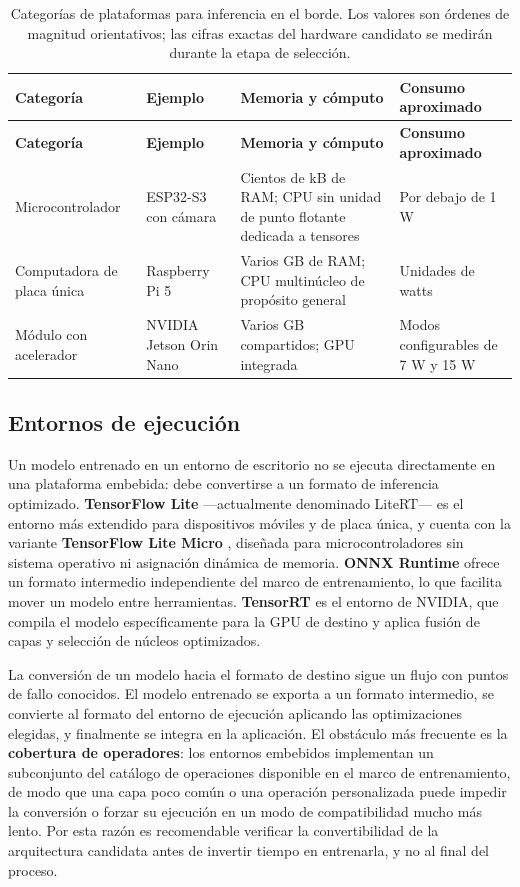 \begin{longtable}{L{2.9cm}L{3.3cm}L{3.3cm}L{3.5cm}}
\caption{Categorías de plataformas para inferencia en el borde. Los valores
son órdenes de magnitud orientativos; las cifras exactas del hardware
candidato se medirán durante la etapa de selección.}
\label{tab:plataformas} \\
\toprule
\textbf{Categoría} & \textbf{Ejemplo} & \textbf{Memoria y cómputo} & \textbf{Consumo aproximado} \\
\midrule
\endfirsthead
\toprule
\textbf{Categoría} & \textbf{Ejemplo} & \textbf{Memoria y cómputo} & \textbf{Consumo aproximado} \\
\midrule
\endhead
Microcontrolador & ESP32-S3 con cámara & Cientos de kB de RAM; CPU sin unidad de punto flotante dedicada a tensores & Por debajo de 1 W \\
Computadora de placa única & Raspberry Pi 5 & Varios GB de RAM; CPU multinúcleo de propósito general & Unidades de watts \\
Módulo con acelerador & NVIDIA Jetson Orin Nano & Varios GB compartidos; GPU integrada & Modos configurables de 7 W y 15 W \\
\bottomrule
\end{longtable}

\subsection{Entornos de ejecución}

Un modelo entrenado en un entorno de escritorio no se ejecuta directamente
en una plataforma embebida: debe convertirse a un formato de inferencia
optimizado. \textbf{TensorFlow Lite} —actualmente denominado LiteRT— es el
entorno más extendido para dispositivos móviles y de placa única, y cuenta
con la variante \textbf{TensorFlow Lite Micro} \citep{david2021}, diseñada
para microcontroladores sin sistema operativo ni asignación dinámica de
memoria. \textbf{ONNX Runtime} ofrece un formato intermedio independiente
del marco de entrenamiento, lo que facilita mover un modelo entre
herramientas. \textbf{TensorRT} es el entorno de NVIDIA, que compila el
modelo específicamente para la GPU de destino y aplica fusión de capas y
selección de núcleos optimizados.

La conversión de un modelo hacia el formato de destino sigue un flujo con
puntos de fallo conocidos. El modelo entrenado se exporta a un formato
intermedio, se convierte al formato del entorno de ejecución aplicando las
optimizaciones elegidas, y finalmente se integra en la aplicación. El
obstáculo más frecuente es la \textbf{cobertura de operadores}: los
entornos embebidos implementan un subconjunto del catálogo de operaciones
disponible en el marco de entrenamiento, de modo que una capa poco común o
una operación personalizada puede impedir la conversión o forzar su
ejecución en un modo de compatibilidad mucho más lento. Por esta razón es
recomendable verificar la convertibilidad de la arquitectura candidata
antes de invertir tiempo en entrenarla, y no al final del proceso.


